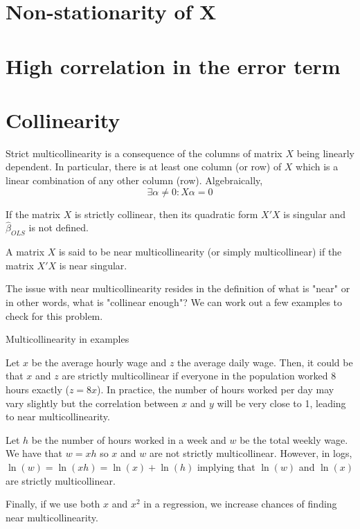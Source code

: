 \section{Non-stationarity of X}

\section{High correlation in the error term}

\section{Collinearity}

\begin{definition}
Strict multicollinearity is a consequence of the columns of matrix $X$ being linearly dependent. In particular, there is at least one column (or row) of $X$ which is a linear combination of any other column (row). Algebraically, $$\exists \alpha\neq 0 : X\alpha = 0$$
\end{definition}

\begin{remark}
If the matrix $X$ is strictly collinear, then its quadratic form $X'X$ is singular and $\hat{\beta}_{OLS}$ is not defined.
\end{remark}

\begin{definition}
A matrix $X$ is said to be near multicollinearity (or simply multicollinear) if the matrix $X'X$ is near singular.
\end{definition}

The issue with near multicollinearity resides in the definition of what is "near" or in other words, what is "collinear enough"? We can work out a few examples to check for this problem.

\begin{bclogo}[couleur=blue!10, arrondi=0.1, logo=,ombre=false]{ Multicollinearity in examples} 
\begin{small}
Let $x$ be the average hourly wage and $z$ the average daily wage. Then, it could be that $x$ and $z$ are strictly multicollinear if everyone in the population worked 8 hours exactly ($z = 8x$). In practice, the number of hours worked per day may vary slightly but the correlation between $x$ and $y$ will be very close to 1, leading to near multicollinearity.

Let $h$ be the number of hours worked in a week and $w$ be the total weekly wage. We have that $w = xh$ so $x$ and $w$ are not strictly multicollinear. However, in logs, $\ln(w) = \ln(xh) = \ln(x) + \ln(h)$ implying that $\ln(w)$ and $\ln(x)$ are strictly multicollinear.

Finally, if we use both $x$ and $x^2$ in a regression, we increase chances of finding near multicollinearity.
\end{small}
\end{bclogo}


